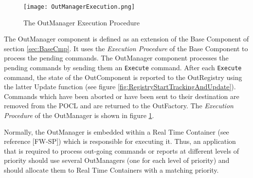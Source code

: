 \begin{figure}[h]
 \centering
 \texttt{[image: OutManagerExecution.png]}
 \caption{The OutManager Execution Procedure}
 \label{fig:OutManagerExecution}
\end{figure}

The OutManager component is defined as an extension of the Base Component of section \ref{sec:BaseCmp}. It uses the \textit{Execution Procedure} of the Base Component to process the pending commands. The OutManager component processes the pending commands by sending them an \texttt{Execute} command. After each \texttt{Execute} command, the state of the OutComponent is reported to the OutRegistry using the latter Update function (see figure \ref{fig:RegistryStartTrackingAndUpdate}). Commands which have been aborted or have been sent to their destination are removed from the POCL and are returned to the OutFactory. The \textit{Execution Procedure} of the OutManager is shown in figure \ref{fig:OutManagerExecution}.

Normally, the OutManager is embedded within a Real Time Container (see reference [FW-SP]) which is responsible for executing it. Thus, an application that is required to process out-going commands or reports at different levels of priority should use several OutManagers (one for each level of priority) and should allocate them to Real Time Containers with a matching priority.

